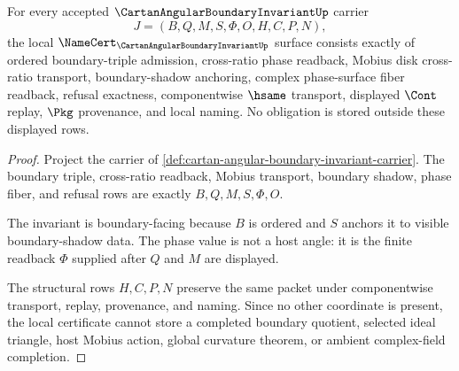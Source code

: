 \begin{theorem}
\label{thm:cartan-angular-boundary-invariant-namecert-obligations}
For every accepted $\CartanAngularBoundaryInvariantUp$ carrier
$$
J=(B,Q,M,S,\Phi,O,H,C,P,N),
$$
the local $\NameCert_{\CartanAngularBoundaryInvariantUp}$ surface consists exactly of ordered boundary-triple admission, cross-ratio phase readback, Mobius disk cross-ratio transport, boundary-shadow anchoring, complex phase-surface fiber readback, refusal exactness, componentwise $\hsame$ transport, displayed $\Cont$ replay, $\Pkg$ provenance, and local naming. No obligation is stored outside these displayed rows.
\end{theorem}
\begin{proof}
Project the carrier of \autoref{def:cartan-angular-boundary-invariant-carrier}. The boundary triple, cross-ratio readback, Mobius transport, boundary shadow, phase fiber, and refusal rows are exactly $B,Q,M,S,\Phi,O$.

The invariant is boundary-facing because $B$ is ordered and $S$ anchors it to visible boundary-shadow data. The phase value is not a host angle: it is the finite readback $\Phi$ supplied after $Q$ and $M$ are displayed.

The structural rows $H,C,P,N$ preserve the same packet under componentwise transport, replay, provenance, and naming. Since no other coordinate is present, the local certificate cannot store a completed boundary quotient, selected ideal triangle, host Mobius action, global curvature theorem, or ambient complex-field completion.
\end{proof}

